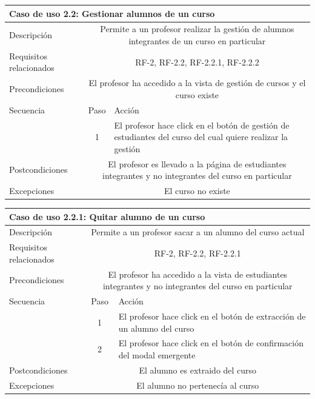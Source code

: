 \begin{adjustwidth}{-2cm}{}
\begin{tabular}[H]{l c l}
\toprule 
\multicolumn{3}{l}{\textbf{Caso de uso 2.2: Gestionar alumnos de un curso}}\\
\midrule
Descripción & \multicolumn{2}{p{10cm}}{Permite a un profesor realizar la gestión de alumnos integrantes de un curso en particular}\\
\midrule
Requisitos relacionados & \multicolumn{2}{p{10cm}}{RF-2, RF-2.2, RF-2.2.1, RF-2.2.2}\\
\midrule
Precondiciones & \multicolumn{2}{p{10cm}}{El profesor ha accedido a la vista de gestión de cursos y el curso existe}\\
\midrule
Secuencia & Paso & Acción \\
\cmidrule{2-3}
         & 1 &  \multicolumn{1}{p{8cm}}{El profesor hace click en el botón de gestión de estudiantes del curso del cual quiere realizar la gestión}\\

\midrule
Postcondiciones & \multicolumn{2}{p{10cm}}{El profesor es llevado a la página de estudiantes integrantes y no integrantes del curso en particular}\\
\midrule
Excepciones & \multicolumn{2}{p{10cm}}{El curso no existe}\\
\bottomrule 
\end{tabular}

\hspace{3cm}

\begin{tabular}[H]{l c l}
\toprule 
\multicolumn{3}{l}{\textbf{Caso de uso 2.2.1: Quitar alumno de un curso}}\\
\midrule
Descripción & \multicolumn{2}{p{10cm}}{Permite a un profesor sacar a un alumno del curso actual}\\
\midrule
Requisitos relacionados & \multicolumn{2}{p{10cm}}{RF-2, RF-2.2, RF-2.2.1}\\
\midrule
Precondiciones & \multicolumn{2}{p{10cm}}{El profesor ha accedido a la vista de estudiantes integrantes y no integrantes del curso en particular}\\
\midrule
Secuencia & Paso & Acción \\
\cmidrule{2-3}
         & 1 &  \multicolumn{1}{p{8cm}}{El profesor hace click en el botón de extracción de un alumno del curso}\\
         & 2 &  \multicolumn{1}{p{8cm}}{El profesor hace click en el botón de confirmación del modal emergente}\\
\midrule
Postcondiciones & \multicolumn{2}{p{10cm}}{El alumno es extraido del curso}\\
\midrule
Excepciones & \multicolumn{2}{p{10cm}}{El alumno no pertenecía al curso}\\
\bottomrule 
\end{tabular}
\end{adjustwidth}


